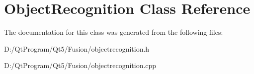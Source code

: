 \hypertarget{class_object_recognition}{}\section{Object\+Recognition Class Reference}
\label{class_object_recognition}


The documentation for this class was generated from the following files\+:\begin{DoxyCompactItemize}
\item 
D\+:/\+Qt\+Program/\+Qt5/\+Fusion/objectrecognition.\+h\item 
D\+:/\+Qt\+Program/\+Qt5/\+Fusion/objectrecognition.\+cpp\end{DoxyCompactItemize}
